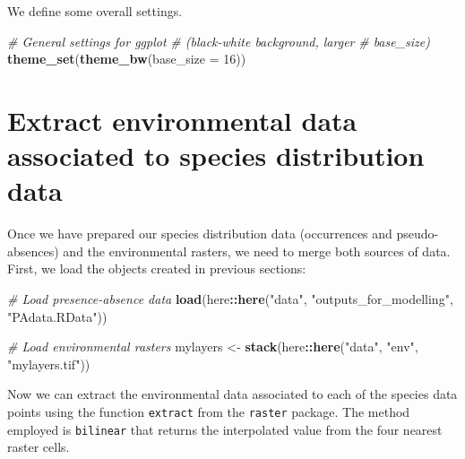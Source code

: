\documentclass[
]{book}
\newenvironment{Shaded}{\begin{snugshade}}{\end{snugshade}}
\newcommand{\AttributeTok}[1]{\textcolor[rgb]{0.13,0.29,0.53}{#1}}
\newcommand{\CommentTok}[1]{\textcolor[rgb]{0.56,0.35,0.01}{\textit{#1}}}
\newcommand{\DecValTok}[1]{\textcolor[rgb]{0.00,0.00,0.81}{#1}}
\newcommand{\FunctionTok}[1]{\textcolor[rgb]{0.13,0.29,0.53}{\textbf{#1}}}
\newcommand{\NormalTok}[1]{#1}
\newcommand{\OtherTok}[1]{\textcolor[rgb]{0.56,0.35,0.01}{#1}}
\newcommand{\SpecialCharTok}[1]{\textcolor[rgb]{0.81,0.36,0.00}{\textbf{#1}}}
\newcommand{\StringTok}[1]{\textcolor[rgb]{0.31,0.60,0.02}{#1}}
\begin{document}
We define some overall settings.

\begin{Shaded}
\begin{Highlighting}[]
\CommentTok{\# General settings for ggplot}
\CommentTok{\# (black{-}white background, larger}
\CommentTok{\# base\_size)}
\FunctionTok{theme\_set}\NormalTok{(}\FunctionTok{theme\_bw}\NormalTok{(}\AttributeTok{base\_size =} \DecValTok{16}\NormalTok{))}
\end{Highlighting}
\end{Shaded}

\section{Extract environmental data associated to species distribution data}\label{extract-environmental-data-associated-to-species-distribution-data}

Once we have prepared our species distribution data (occurrences and pseudo-absences) and the environmental rasters, we need to merge both sources of data. First, we load the objects created in previous sections:

\begin{Shaded}
\begin{Highlighting}[]
\CommentTok{\# Load presence{-}absence data}
\FunctionTok{load}\NormalTok{(here}\SpecialCharTok{::}\FunctionTok{here}\NormalTok{(}\StringTok{"data"}\NormalTok{, }\StringTok{"outputs\_for\_modelling"}\NormalTok{,}
    \StringTok{"PAdata.RData"}\NormalTok{))}

\CommentTok{\# Load environmental rasters}
\NormalTok{mylayers }\OtherTok{\textless{}{-}} \FunctionTok{stack}\NormalTok{(here}\SpecialCharTok{::}\FunctionTok{here}\NormalTok{(}\StringTok{"data"}\NormalTok{, }\StringTok{"env"}\NormalTok{,}
    \StringTok{"mylayers.tif"}\NormalTok{))}
\end{Highlighting}
\end{Shaded}

Now we can extract the environmental data associated to each of the species data points using the function \texttt{extract} from the \texttt{raster} package. The method employed is \texttt{bilinear} that returns the interpolated value from the four nearest raster cells.
\end{document}
